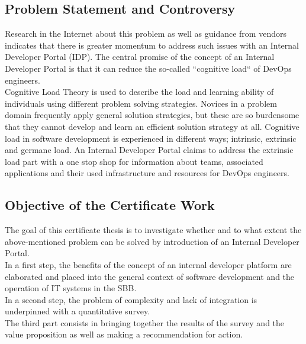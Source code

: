 \documentclass[a4paper,12pt]{article}
\begin{document}
    \subsection{Problem Statement and Controversy}
    \label{subsec:iproblemstatement}
    Research in the Internet about this problem as well as guidance from vendors indicates that there is greater momentum
    to address such issues with an Internal Developer Portal (IDP).
    The central promise of the concept of an Internal Developer Portal is that it can reduce the so-called ``cognitive load`` of DevOps engineers.\\
    Cognitive Load Theory is used to describe the load and learning ability of individuals using different problem solving
    strategies.
    Novices in a problem domain frequently apply general solution strategies, but these are so burdensome that they
    cannot develop and learn an efficient solution strategy at all\parencite{cogload}.
    Cognitive load in software development is experienced in different ways; intrinsic, extrinsic and germane load\parencite{cogdev}.
    An Internal Developer Portal claims to address the extrinsic load part with a one stop shop for information about teams, associated applications and
    their used infrastructure and resources for DevOps engineers.

    \subsection{Objective of the Certificate Work}
    \label{subsec:iobjective}
    The goal of this certificate thesis is to investigate whether and to what extent the above-mentioned problem
    can be solved by introduction of an Internal Developer Portal.\\
    In a first step, the benefits of the concept of an internal developer platform are elaborated and placed
    into the general context of software development and the operation of IT systems in the SBB.\\
    In a second step, the problem of complexity and lack of integration is underpinned with a quantitative survey.\\
    The third part consists in bringing together the results of the survey and the value proposition as well as making a
    recommendation for action.
\end{document}
